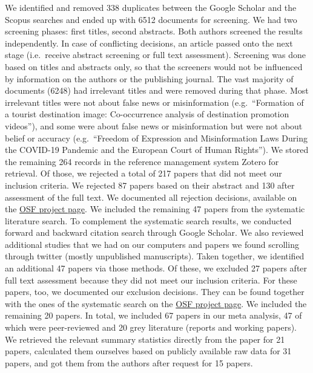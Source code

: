 \documentclass[
  man]{apa6}
\begin{document}
We identified and removed 338 duplicates between the Google Scholar and the Scopus searches and ended up with 6512 documents for screening. We had two screening phases: first titles, second abstracts. Both authors screened the results independently. In case of conflicting decisions, an article passed onto the next stage (i.e.~receive abstract screening or full text assessment). Screening was done based on titles and abstracts only, so that the screeners would not be influenced by information on the authors or the publishing journal. The vast majority of documents (6248) had irrelevant titles and were removed during that phase. Most irrelevant titles were not about false news or misinformation (e.g.~``Formation of a tourist destination image: Co-occurrence analysis of destination promotion videos''), and some were about false news or misinformation but were not about belief or accuracy (e.g.~``Freedom of Expression and Misinformation Laws During the COVID-19 Pandemic and the European Court of Human Rights''). We stored the remaining 264 records in the reference management system Zotero for retrieval. Of those, we rejected a total of 217 papers that did not meet our inclusion criteria. We rejected 87 papers based on their abstract and 130 after assessment of the full text. We documented all rejection decisions, available on the \href{https://osf.io/96zbp/?view_only=d2f3147f652e44e2a0414d7d6d9a6c29}{OSF project page}. We included the remaining 47 papers from the systematic literature search. To complement the systematic search results, we conducted forward and backward citation search through Google Scholar. We also reviewed additional studies that we had on our computers and papers we found scrolling through twitter (mostly unpublished manuscripts). Taken together, we identified an additional 47 papers via those methods. Of these, we excluded 27 papers after full text assessment because they did not meet our inclusion criteria. For these papers, too, we documented our exclusion decisions. They can be found together with the ones of the systematic search on the \href{https://osf.io/96zbp/?view_only=d2f3147f652e44e2a0414d7d6d9a6c29}{OSF project page}. We included the remaining 20 papers. In total, we included 67 papers in our meta analysis, 47 of which were peer-reviewed and 20 grey literature (reports and working papers). We retrieved the relevant summary statistics directly from the paper for 21 papers, calculated them ourselves based on publicly available raw data for 31 papers, and got them from the authors after request for 15 papers.
\end{document}
